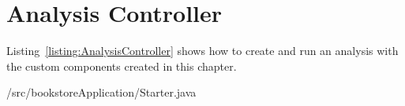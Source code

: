 \setJavaCodeListing


\section{Analysis Controller}\label{sec:analysis:controller}

Listing~\ref{listing:AnalysisController} shows how to create and run an analysis %
with the custom components created in this chapter. 

\setJavaCodeListing
	{\customComponentsBookstoreApplicationDir/src/bookstoreApplication/Starter.java}
